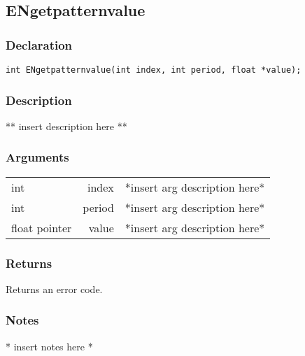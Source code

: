 \subsection{ENgetpatternvalue}
\subsubsection{Declaration}
\begin{lstlisting}
int ENgetpatternvalue(int index, int period, float *value);
\end{lstlisting}
\subsubsection{Description}
** insert description here **
\subsubsection{Arguments}
\begin{tabular}{l r p{11cm} }
int&index&*insert arg description here* \\[6pt]
int&period&*insert arg description here* \\[6pt]
float pointer&value&*insert arg description here* \\[6pt]
\end{tabular}
\subsubsection{Returns}
Returns an error code.
\subsubsection{Notes}
* insert notes here *